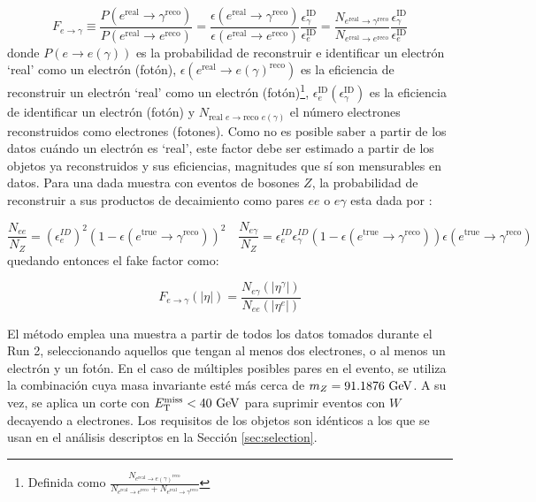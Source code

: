 \begin{equation}
  F_{e\to \gamma} \equiv \frac{P(e^{\text{real}}\to \gamma^{\text{reco}})}{P(e^{\text{real}}\to e^{\text{reco}})}  = \frac{\epsilon(e^{\text{real}}\to \gamma^{\text{reco}})}{\epsilon(e^{\text{real}}\to e^{\text{reco}})} \frac{\epsilon^{\text{ID}}_{\gamma}}{\epsilon^{\text{ID}}_{e}} = \frac{N_{e^{\text{real}}\to \gamma^{\text{reco}}}}{N_{e^{\text{real}}\to e^{\text{reco}}}} \frac{\epsilon^{\text{ID}}_{\gamma}}{\epsilon^{\text{ID}}_{e}}
  \label{eq:efake_ff}
\end{equation} 
%
donde $P(e\to e(\gamma))$ es la probabilidad de reconstruir e identificar un electrón `real' como un electrón (fotón), $\epsilon(e^{\text{real}}\to e(\gamma)^{\text{reco}})$ es la eficiencia de reconstruir un electrón `real' como un electrón (fotón)\footnote{Definida como $\frac{N_{e^{\text{real}}\to e(\gamma)^{\text{reco}}}}{N_{e^{\text{real}}\to e^{\text{reco}}}+N_{e^{\text{real}}\to \gamma^{\text{reco}}}}$}, $\epsilon^{\text{ID}}_{e} (\epsilon^{\text{ID}}_{\gamma})$ es la eficiencia de identificar un electrón (fotón) y $N_{\text{real } e\to \text{reco } e(\gamma)}$ el número electrones reconstruidos como electrones (fotones). Como no es posible saber a partir de los datos cuándo un electrón es `real', este factor debe ser estimado a partir de los objetos ya reconstruidos y sus eficiencias, magnitudes que sí son mensurables en datos. Para una dada muestra con eventos de bosones $Z$, la probabilidad de reconstruir a sus productos de decaimiento como pares $ee$ o $e\gamma$ esta dada por :

\begin{equation}
\frac{N_{ee}}{N_Z} = (\epsilon^{ID}_{e})^{2} (1-\epsilon(e^{\text{true}}\to \gamma^{\text{reco}}))^{2}
\quad
\frac{N_{e\gamma}}{N_Z} = \epsilon^{ID}_{e}\epsilon^{ID}_{\gamma} (1-\epsilon(e^{\text{true}}\to \gamma^{\text{reco}}))\epsilon(e^{\text{true}}\to \gamma^{\text{reco}})
\end{equation}
% 
quedando entonces el fake factor como:

\begin{equation}
  F_{e\to \gamma}(|\eta|) = \frac{N_{e\gamma}(|\eta^{\gamma}|)}{N_{ee}(|\eta^{e}|)}
\end{equation}


El método emplea una muestra a partir de todos los datos tomados durante el Run 2, seleccionando aquellos que tengan al menos dos electrones, o al menos un electrón y un fotón. En el caso de múltiples posibles pares en el evento, se utiliza la combinación cuya masa invariante esté más cerca de $m_Z=91.1876\ \gev$. A su vez, se aplica un corte con $E_{\text{T}}^{\text{miss}}<40\ \text{GeV}$ para suprimir eventos con $W$ decayendo a electrones. Los requisitos de los objetos son idénticos a los que se usan en el análisis descriptos en la Sección \ref{sec:selection}.


